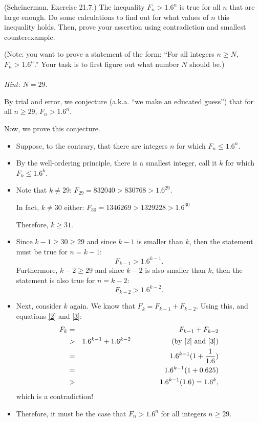 \documentclass{article}
\theoremstyle{definition}
\begin{document}
\begin{question}
    (Scheinerman, Exercise 21.7:) 
    The inequality $F_n > 1.6^n$ is true for all $n$ that are large enough.  Do some calculations to find out for what values of $n$ this inequality holds.  Then, prove your assertion using contradiction and smallest counterexample.

    (Note: you want to prove a statement of the form: ``For all integers $n \geq N$, $F_n > 1.6^n$.''  Your task is to first figure out what number $N$ should be.)\\~\\
    \textit{Hint: $N=29$.}
\end{question}
\begin{solution}
By trial and error, we conjecture (a.k.a. ``we make an educated guess'') that for all $n \geq 29$, $F_n > 1.6^n$.

Now, we prove this conjecture.

\begin{itemize}
\item Suppose, to the contrary, that there are integers $n$ for which $F_n \leq 1.6^n$.
\item By the well-ordering principle, there is a smallest integer, call it $k$ for which $F_k \leq 1.6^k$.
\item Note that $k \neq 29$: $F_{29} = 832040 > 830768 > 1.6^{29}$.  

In fact, $k \neq 30$ either: $F_{30} = 1346269 > 1329228 > 1.6^{30}$

Therefore, $k \geq 31$. 
\item Since $k-1 \geq 30 \geq 29$ and since $k-1$ is smaller than $k$, then the statement must be true for $n = k-1$:
\begin{equation} F_{k-1} > 1.6^{k-1}. \label{2}\end{equation}
Furthermore, $k-2 \geq 29$ and since $k-2$ is also smaller than $k$, then the statement is also true for $n = k-2$:
\begin{equation} F_{k-2} > 1.6^{k-2}. \label{3} \end{equation}
\item  Next, consider $k$ again.  We know that $F_{k} = F_{k-1} + F_{k-2}$.  Using this, and equations \eqref{2} and \eqref{3}:
\begin{eqnarray*}
F_k & = & F_{k-1} + F_{k-2} \\
	& > & 1.6^{k-1} + 1.6^{k-2} \hspace{2cm} (\text{by \eqref{2} and \eqref{3}})\\
	& = & 1.6^{k-1} (1 + \frac{1}{1.6}) \\
	& = & 1.6^{k-1} (1 + 0.625) \\
	& > & 1.6^{k-1} (1.6) = 1.6^{k},
\end{eqnarray*}
which is a contradiction!
\item Therefore, it must be the case that $F_n > 1.6^n$ for all integers $n \geq 29$.\\~\\
\end{itemize}
\end{solution}
\end{document}
